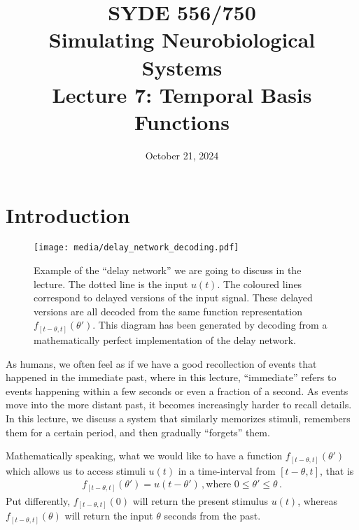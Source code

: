 \documentclass[10pt,letterpaper,oneside]{article}
\date{October 21, 2024}
\title{SYDE 556/750 \\ Simulating Neurobiological Systems \\ Lecture 7: Temporal Basis Functions}
\begin{document}

\section{Introduction}

\begin{figure}[h]
	\centering
	\texttt{[image: media/delay\_network\_decoding.pdf]}
	\caption{Example of the \enquote{delay network} we are going to discuss in the lecture. The dotted line is the input $u(t)$. The coloured lines correspond to delayed versions of the input signal. These delayed versions are all decoded from the same function representation $f_{[t - \theta, t]}(\theta')$. This diagram has been generated by decoding from a mathematically perfect implementation of the delay network. }
\end{figure}


As humans, we often feel as if we have a good recollection of events that happened in the immediate past, where in this lecture, \enquote{immediate} refers to events happening within a few seconds or even a fraction of a second. As events move into the more distant past, it becomes increasingly harder to recall details. In this lecture, we discuss a system that similarly memorizes stimuli, remembers them for a certain period, and then gradually \enquote{forgets} them.

Mathematically speaking, what we would like to have a function $f_{[t - \theta, t]}(\theta')$ which allows us to access stimuli $u(t)$ in a time-interval from $[t - \theta, t]$, that is
\begin{align*}
	f_{[t - \theta, t]}(\theta') = u\left(t - \theta' \right) \,, \text{where } 0 \leq \theta' \leq \theta \,.
\end{align*}
Put differently, $f_{[t - \theta, t]}(0)$ will return the present stimulus $u(t)$, whereas $f_{[t - \theta, t]}(\theta)$ will return the input $\theta$ seconds from the past.
\end{document}

